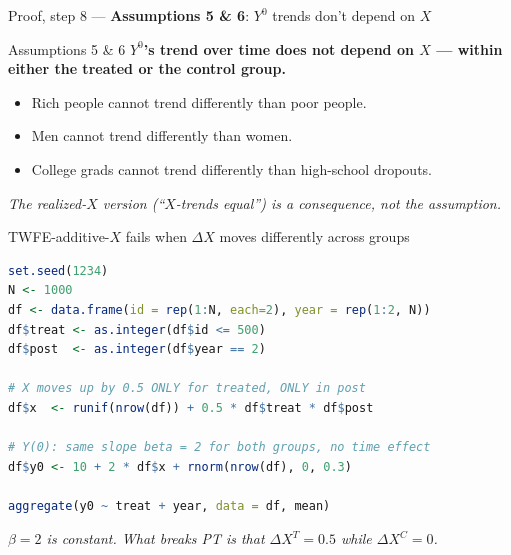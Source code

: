 \documentclass[aspectratio=169,11pt]{beamer}
\begin{document}
\begin{frame}{Proof, step 8 --- \textbf{Assumptions 5 \& 6}: $Y^0$ trends don't depend on $X$}
\vspace{0.4em}
\begin{block}{Assumptions 5 \& 6}
\centering
\small\textbf{$Y^0$'s trend over time does not depend on $X$ --- within either the treated or the control group.}
\end{block}
\vspace{0.4em}
\begin{itemize}\footnotesize
  \item Rich people cannot trend differently than poor people.
  \item Men cannot trend differently than women.
  \item College grads cannot trend differently than high-school dropouts.
\end{itemize}
\vspace{0.2em}
\begin{center}
\footnotesize\color{warmgray}\itshape
The realized-$X$ version (``$X$-trends equal'') is a \textit{consequence}, not the assumption.
\end{center}
\vspace{0.1em}
\begin{center}
\footnotesize
{}
\end{center}
\end{frame}


\begin{frame}[fragile]{TWFE-additive-$X$ fails when $\Delta X$ moves differently across groups}
\vspace{0.3em}
\begin{lstlisting}[basicstyle=\ttfamily\footnotesize,frame=none,language=R,keywordstyle=\color{accentdark}\bfseries,commentstyle=\color{warmgray}\itshape]
set.seed(1234)
N <- 1000
df <- data.frame(id = rep(1:N, each=2), year = rep(1:2, N))
df$treat <- as.integer(df$id <= 500)
df$post  <- as.integer(df$year == 2)

# X moves up by 0.5 ONLY for treated, ONLY in post
df$x  <- runif(nrow(df)) + 0.5 * df$treat * df$post

# Y(0): same slope beta = 2 for both groups, no time effect
df$y0 <- 10 + 2 * df$x + rnorm(nrow(df), 0, 0.3)

aggregate(y0 ~ treat + year, data = df, mean)
\end{lstlisting}
\vspace{0.3em}
\begin{center}
\small\color{warmgray}\itshape
$\beta = 2$ is constant. \;What breaks PT is that $\Delta X^T = 0.5$ while $\Delta X^C = 0$.
\end{center}
\end{frame}
\end{document}
